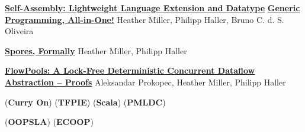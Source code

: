 \documentclass[9pt]{article}
\begin{document}
\noindent\href{https://infoscience.epfl.ch/record/199389}{\bf Self-Assembly: Lightweight Language Extension and Datatype}
\newline\noindent\href{https://infoscience.epfl.ch/record/199389}{\bf Generic Programming, All-in-One!}\dates{}
\newline\noindent Heather Miller, Philipp Haller, Bruno C. d. S. Oliveira
\medskip

\noindent\href{http://infoscience.epfl.ch/record/191240}{\bf Spores, Formally}
\newline\noindent Heather Miller, Philipp Haller
\medskip

\noindent\href{http://infoscience.epfl.ch/record/181098}{\bf  FlowPools: A Lock-Free Deterministic Concurrent Dataflow}
\newline\noindent\href{http://infoscience.epfl.ch/record/181098}{\bf  Abstraction -- Proofs}\dates{}
\newline\noindent Aleksandar Prokopec, Heather Miller, Philipp Haller


\bigskip
{}


\newline{} {(\textbf{Curry On})} 
\newline{} {(\textbf{TFPIE})} 
\newline{} {(\textbf{Scala})}  
\newline{} {(\textbf{PMLDC})}  
\medskip

{} {(\textbf{OOPSLA})} 
 {(\textbf{ECOOP})} 
\medskip
\end{document}
